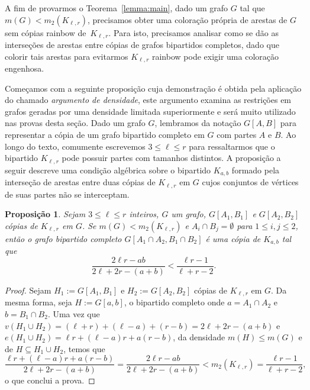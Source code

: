 \documentclass[12pt,a4paper]{book}
\newcommand{\K}{K_{\ell,r}} %
\let\subset\subseteq
\newtheorem{proposicao} [teorema] {Proposição}
\begin{document}
     A fim de provarmos o Teorema~\ref{lemma:main}, dado um grafo $G$ tal que
     $m(G) < m_2(\K)$, 
     precisamos obter uma coloração própria de arestas de $G$ sem cópias rainbow de~$\K$. 
     Para isto, precisamos analisar como se dão as interseções de arestas entre cópias de grafos bipartidos completos, dado que colorir tais arestas para evitarmos $\K$ rainbow pode exigir uma coloração engenhosa. 
     
     Começamos com a seguinte proposição cuja demonstração é obtida
     pela aplicação do chamado \textit{argumento de densidade}, este argumento examina as restrições em grafos geradas por uma densidade limitada superiormente e será muito utilizado nas provas desta seção.
    Dado um grafo $G$, lembramos da notação $G[A,B]$ para representar a cópia de um grafo bipartido completo em $G$ com partes $A$ e $B$.
    Ao longo do texto, comumente escrevemos $3\leq \ell \leq r$ para ressaltarmos que o bipartido $\K$ pode possuir partes com tamanhos distintos. 
    A proposição a seguir descreve uma condição algébrica sobre o bipartido $K_{a,b}$ formado pela interseção de arestas entre duas cópias de $\K$ em $G$ cujos conjuntos de vértices de suas partes não se interceptam.

    \begin{proposicao}
        \label{lemma:inter_a} 
    Sejam $3\leq \ell \leq r$ inteiros, $G$ um grafo, $G[A_1,B_1]$ e $G[A_2,B_2]$ cópias de $K_{\ell,r}$ em $G$. 
    Se $m(G) < m_2(\K)$ e
    $A_i \cap B_j = \emptyset$ 
    para $1\leq i,j\leq 2$, então o grafo bipartido completo
    $G[A_1\cap A_2, B_1\cap B_2]$ é uma cópia de $K_{a,b}$ tal que
      \begin{equation}
         \label{eq:pairs-ab} 
    	 \frac{2\ell r - ab}{2\ell + 2r - (a+b)} <
    \frac{\ell r - 1}{\ell + r - 2}.
      \end{equation}
      \end{proposicao}
    \begin{proof}
    Sejam $H_1:=G[A_1,B_1]$ e ${H_2:=G[A_2,B_2]}$ cópias de $\K$ em $G$.
    Da mesma forma, seja $H := G[a,b]$, o bipartido completo onde $a = A_1\cap
    A_2$ e $b = B_1\cap B_2$.  
    Uma vez que 
    $v(H_1 \cup H_2) = (\ell + r) +
    (\ell-a) + (r - b) = 2\ell + 2r - (a+b)$ 
    e $e(H_1 \cup H_2) = \ell r + (\ell-a)r + a(r-b)$, 
    da densidade $m(H) \leq m(G)$ e de $H\subset H_1\cup
    H_2$, temos que
      \begin{equation*} 
      \frac{\ell r + (\ell-a)r + a(r-b)}{2\ell + 2r -
    (a+b)} = \frac{2\ell r - ab}{2\ell + 2r - (a+b)} < m_2(\K) = \frac{\ell r -
    1}{\ell + r - 2},
      \end{equation*}
      o que conclui a prova.
    \end{proof}
    
\end{document}
